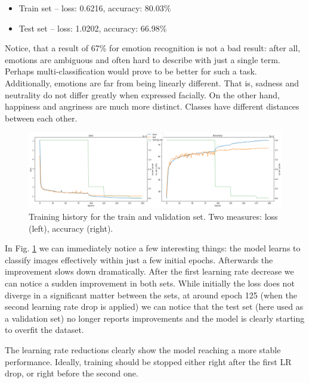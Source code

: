 \documentclass{ledger}
\begin{document}
\begin{itemize}
	\item Train set -- loss: 0.6216, accuracy: 80.03\%
	\item Test set -- loss: 1.0202, accuracy: 66.98\%
\end{itemize}

Notice, that a result of 67\% for emotion recognition is not a bad result: after all, emotions are ambiguous and often hard to describe with just a single term. Perhaps multi-classification would prove to be better for such a task. Additionally, emotions are far from being linearly different. That is, sadness and neutrality do not differ greatly when expressed facially. On the other hand, happiness and angriness are much more distinct. Classes have different distances between each other.



\begin{figure}[H]
	\centering
	\includegraphics[width=1\textwidth]{assets/image_training_results.png}
	\caption{Training history for the train and validation set. Two measures: loss (left), accuracy (right).}
	\label{fig:image-training-results}
\end{figure}

In Fig. \ref{fig:image-training-results} we can immediately notice a few interesting things: the model learns to classify images effectively within just a few initial epochs. Afterwards the improvement slows down dramatically. After the first learning rate decrease we can notice a sudden improvement in both sets. While initially the loss does not diverge in a significant matter between the sets, at around epoch 125 (when the second learning rate drop is applied) we can notice that the test set (here used as a validation set) no longer reports improvements and the model is clearly starting to overfit the dataset.


The learning rate reductions clearly show the model reaching a more stable performance. Ideally, training should be stopped either right after the first LR drop, or right before the second one.
\end{document}
